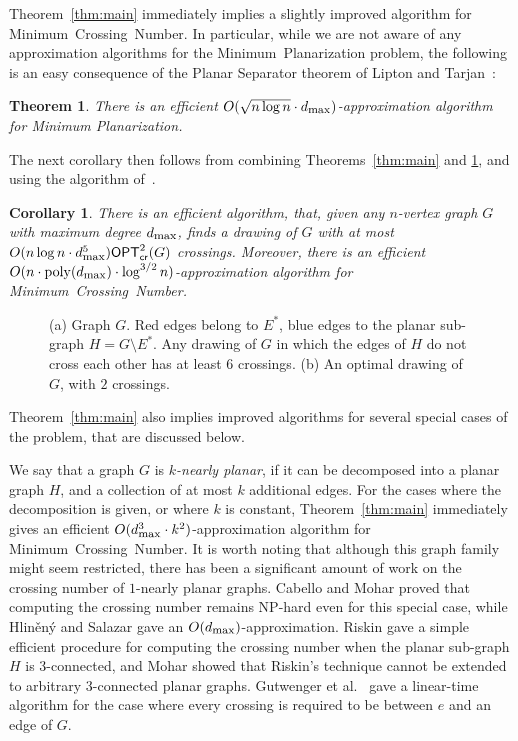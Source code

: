 \documentclass[twoside,leqno,twocolumn]{article}
\newtheorem{theorem}{Theorem}
\newtheorem{corollary}{Corollary}
\newcommand{\poly}{\operatorname{poly}}
\newcommand{\MP}{\mbox{\sf Minimum Planarization}\xspace}
\newcommand{\MCN}{\mbox{\sf Minimum Crossing Number}\xspace}
\newcommand{\optcrosq}[1]{\mathsf{OPT}^{2}_{\mathsf{cr}}(#1)}
\newcommand{\dmax}{d_{\mbox{\textup{\footnotesize{max}}}}}
\begin{document}
Theorem~\ref{thm:main} immediately implies a slightly improved algorithm for \MCN. In particular, while we are not aware of any approximation algorithms for the \MP problem, the following is an easy consequence of the Planar Separator theorem of Lipton and Tarjan~\cite{planar-separator}:
\begin{theorem}\label{thm:sqrt n}
There is an efficient $O(\sqrt {n\log n}\cdot \dmax)$-approximation algorithm for {\sf Minimum Planarization}.
\end{theorem}
The next corollary then follows from combining Theorems~\ref{thm:main} and \ref{thm:sqrt n}, and using the algorithm of~\cite{EvenGS02}.
\begin{corollary}\label{corollary:result for general graphs}
There is an efficient algorithm, that, given any $n$-vertex graph $G$ with maximum degree $\dmax$, finds a drawing of $G$ with at most $O(n\log n\cdot \dmax^5)\optcrosq{G}$ crossings. Moreover,  there is an efficient $O(n\cdot\poly(\dmax)\cdot \log^{3/2} n)$-approximation algorithm for \MCN.
\end{corollary} 

\begin{figure}[h]
\begin{center}
 \caption{(a) Graph $G$. Red edges belong to $E^*$, blue edges to the planar sub-graph $H=G\setminus E^*$. Any drawing of $G$ in which the edges of $H$ do not cross each other has at least $6$ crossings. (b) An optimal drawing of $G$, with $2$ crossings.} \label{fig: example}
\end{center}
\end{figure}


Theorem~\ref{thm:main} also implies improved algorithms for several special cases of the problem, that are discussed below.

 We say that a graph $G$ is \emph{$k$-nearly planar}, if it can be decomposed into a planar graph $H$, and a collection of at most $k$ additional edges. For the cases where the decomposition is given, or where $k$ is constant, Theorem~\ref{thm:main} immediately gives an efficient $O(\dmax^3\cdot k^2)$-approximation algorithm for \MCN.
It is worth noting that although this graph family might seem restricted, there has been a significant amount of work on the crossing number of $1$-nearly planar graphs.
Cabello and Mohar \cite{cabello_edge} proved that computing the crossing number remains NP-hard even for this special case, while
Hlin\v{e}n\'{y} and Salazar \cite{HlinenyS06} gave an $O(\dmax)$-approximation.
Riskin \cite{riskin_edge} gave a simple efficient procedure for computing the crossing number when the planar sub-graph $H$ is 3-connected, and
Mohar \cite{Mohar_almost} showed that Riskin's technique cannot be extended to arbitrary 3-connected planar graphs.
Gutwenger et al.~\cite{GutwengerMW05} gave a linear-time algorithm for the case where every crossing is required to be between $e$ and an edge of $G$.
\end{document}
